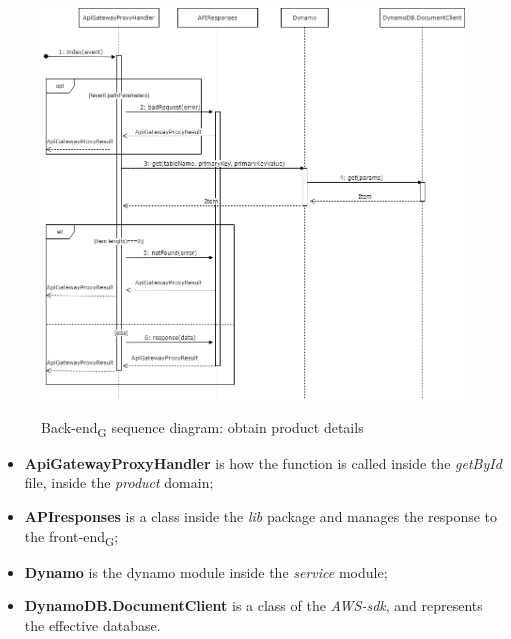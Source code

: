 \begin{figure}[H]
\centering
\includegraphics[scale=0.45]{res/Architettura/Backend/img/diagrammaSequenzaRicezioneProdotto}\\
\caption{Back-end\textsubscript{G} sequence diagram: obtain product details}
\end{figure}

\begin{itemize}
\item \textbf{ApiGatewayProxyHandler} is how the function is called inside the \textit{getById} file, inside the \textit{product} domain;
\item \textbf{APIresponses} is a class inside the \textit{lib} package and manages the response to the front-end\textsubscript{G};
\item \textbf{Dynamo} is the dynamo module inside the \textit{service} module;
\item \textbf{DynamoDB.DocumentClient} is a class of the \textit{AWS-sdk}, and represents the effective database.

\end{itemize}



